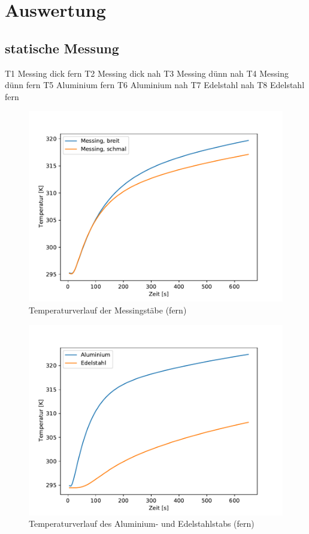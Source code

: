 \section{Auswertung}
\label{sec:Auswertung}

\subsection{statische Messung}
\label{subsec:stat}

T1 Messing dick fern
T2 Messing dick nah
T3 Messing dünn nah 
T4 Messing dünn fern
T5 Aluminium fern
T6 Aluminium nah
T7 Edelstahl nah
T8 Edelstahl fern

\begin{figure}[!htbp]
  \centering
  \includegraphics{verlauf_mess.pdf}
  \caption{Temperaturverlauf der Messingstäbe (fern)}
  \label{fig:mess}
\end{figure}

\begin{figure}[!htbp]
  \centering
  \includegraphics{verlauf_alu_edel.pdf}
  \caption{Temperaturverlauf des Aluminium- und Edelstahlstabs (fern)}
  \label{fig:alu_edel}
\end{figure}

